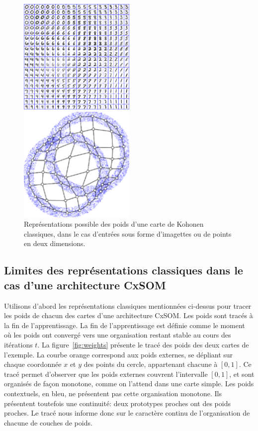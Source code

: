 \begin{figure}
\begin{minipage}{0.5\textwidth}
\centering
\includegraphics[width=0.5\textwidth]{digits.jpg}
\end{minipage}
\begin{minipage}{0.5\textwidth}
\centering
\includegraphics[width=0.5\textwidth]{points.png}
\end{minipage}
\caption{Représentations possible des poids d'une carte de Kohonen classiques, dans le cas d'entrées sous forme d'imagettes ou de points en deux dimensions.\label{fig:representation}}
\end{figure}

\subsection{Limites des représentations classiques dans le cas d'une architecture CxSOM}

Utilisons d'abord les représentations classiques mentionnées ci-dessus pour tracer les poids de chacun des cartes d'une architecture CxSOM. Les poids sont tracés à la fin de l'apprentissage. La fin de l'apprentissage est définie comme le moment où les poids ont convergé vers une organisation restant stable au cours des itérations $t$.
La figure~\ref{fig:weights} présente le tracé des poids des deux cartes de l'exemple.
La courbe orange correspond aux poids externes, se dépliant sur chaque coordonnée $x$ et $y$ des points du cercle, appartenant chacune à $[0,1]$. Ce tracé permet d'observer que les poids externes couvrent l'intervalle $[0,1]$, et sont organisés de façon monotone, comme on l'attend dans une carte simple. Les poids contextuels, en bleu, ne présentent pas cette organisation monotone. Ils présentent toutefois une continuité: deux prototypes proches ont des poids proches. Le tracé nous informe donc sur le caractère continu de l'organisation de chacune de couches de poids. 

